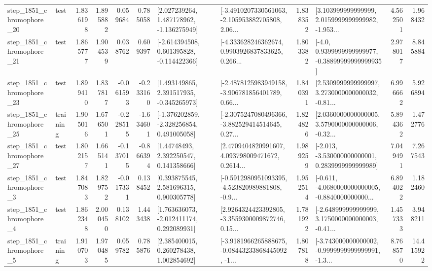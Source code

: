 \begin{tabular}{llrrrrllrlrr}
 step\_1851\_chromophore\_20 &      test &      1.836198 &    1.895882 &      0.059684 &  0.785058 &    [2.027239264, 1.487178962, -1.136275949] &  [-3.4910207330561063, -2.105953882705808, 2.06... &       1.838352 &  [3.103999999999999, 2.0159999999999982, -1.953... &            4.562501 &          1.968432 \\
 step\_1851\_chromophore\_21 &      test &      1.865777 &    1.904539 &      0.038762 &  0.609397 &   [-2.614394508, 0.601395828, -0.114422366] &  [-4.333628246362674, 0.9903926837833625, 0.266... &       1.803382 &   [-4.0, 0.9399999999999977, -0.38899999999999935] &            2.978017 &          8.845884 \\
 step\_1851\_chromophore\_23 &      test &      1.899410 &    1.837817 &     -0.061593 & -0.233160 &    [1.493149865, 2.391517935, -0.345265973] &  [-2.4878125983949158, -3.906781856401789, 0.66... &       1.840391 &  [2.5309999999999997, 3.2730000000000032, -0.81... &            6.996662 &          5.926894 \\
 step\_1851\_chromophore\_25 &  training &      1.905016 &    1.676501 &     -0.228515 & -1.634601 &   [-1.376202859, -2.328256854, 0.491005058] &  [-2.3075247080496366, -3.882529414514645, 0.27... &       1.824826 &  [2.0360000000000005, 3.5790000000000006, -0.32... &            5.894362 &          1.472776 \\
 step\_1851\_chromophore\_27 &      test &      1.802157 &    1.665141 &     -0.137015 & -0.866394 &      [1.44748493, 2.392250547, 0.141358666] &  [2.4709404820991607, 4.093798009471672, 0.2614... &       1.989259 &   [-2.013, -3.530000000000001, 0.2839999999999989] &            7.049491 &          7.267543 \\
  step\_1851\_chromophore\_3 &      test &      1.847083 &    1.829752 &     -0.017331 &  0.138452 &     [0.393875545, 2.581696315, 0.900305778] &  [-0.5912980951093395, -4.523820989881808, -0.9... &       1.952514 &  [-0.611, -4.0680000000000005, -0.8840000000000... &            6.894022 &          1.182460 \\
  step\_1851\_chromophore\_4 &      test &      1.862348 &    2.000450 &      0.138102 &  1.443438 &    [1.763636073, -2.012411174, 0.292089931] &  [2.9264324423392805, -3.3559300009872746, 0.15... &       1.781922 &  [-2.648999999999999, 3.1750000000000003, -0.41... &            1.457333 &          3.948211 \\
  step\_1851\_chromophore\_5 &  training &      1.910703 &    1.970485 &      0.059782 &  0.785876 &     [2.385400015, 0.260278438, 1.002854692] &  [-3.9181966265888675, -0.08443233868445092, -1... &       1.807818 &  [-3.743000000000002, -0.9999999999999991, -1.3... &            8.768570 &         14.415922 \\

\end{tabular}

